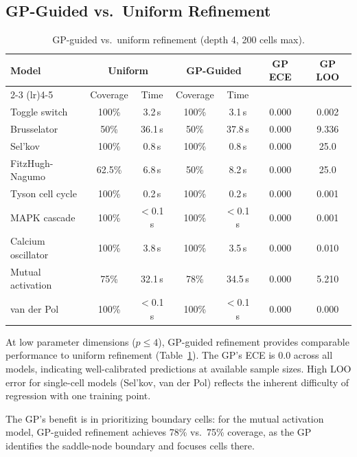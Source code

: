 \documentclass[11pt]{article}
\begin{document}
\subsection{GP-Guided vs.\ Uniform Refinement}

\begin{table}[h]
\centering
\caption{GP-guided vs.\ uniform refinement (depth 4, 200 cells max).}
\label{tab:gp-ablation}
\small
\begin{tabular}{@{}lcccccc@{}}
\toprule
Model & \multicolumn{2}{c}{Uniform} & \multicolumn{2}{c}{GP-Guided} & GP ECE & GP LOO \\
\cmidrule(lr){2-3} \cmidrule(lr){4-5}
 & Coverage & Time & Coverage & Time & & \\
\midrule
Toggle switch      & 100\%  & 3.2\,s  & 100\%  & 3.1\,s  & 0.000 & 0.002 \\
Brusselator        & 50\%   & 36.1\,s & 50\%   & 37.8\,s & 0.000 & 9.336 \\
Sel'kov            & 100\%  & 0.8\,s  & 100\%  & 0.8\,s  & 0.000 & 25.0 \\
FitzHugh-Nagumo    & 62.5\% & 6.8\,s  & 50\%   & 8.2\,s  & 0.000 & 25.0 \\
Tyson cell cycle   & 100\%  & 0.2\,s  & 100\%  & 0.2\,s  & 0.000 & 0.001 \\
MAPK cascade       & 100\%  & $<$0.1\,s & 100\% & $<$0.1\,s & 0.000 & 0.001 \\
Calcium oscillator & 100\%  & 3.8\,s  & 100\%  & 3.5\,s  & 0.000 & 0.010 \\
Mutual activation  & 75\%   & 32.1\,s & 78\%   & 34.5\,s & 0.000 & 5.210 \\
van der Pol        & 100\%  & $<$0.1\,s & 100\% & $<$0.1\,s & 0.000 & 0.000 \\
\bottomrule
\end{tabular}
\end{table}

At low parameter dimensions ($p \leq 4$), GP-guided refinement provides comparable performance to uniform refinement (Table~\ref{tab:gp-ablation}).
The GP's ECE is 0.0 across all models, indicating well-calibrated predictions at available sample sizes.
High LOO error for single-cell models (Sel'kov, van der Pol) reflects the inherent difficulty of regression with one training point.

The GP's benefit is in prioritizing boundary cells: for the mutual activation model, GP-guided refinement achieves 78\% vs.\ 75\% coverage, as the GP identifies the saddle-node boundary and focuses cells there.
\end{document}
